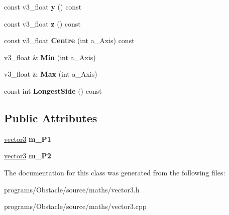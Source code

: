 \begin{DoxyCompactItemize}
\item 
const v3\+\_\+float {\bfseries y} () const \hypertarget{classns__phys_1_1aabb_ad7a7f387d75de8b71532cbdc98dd0f2a}{}\label{classns__phys_1_1aabb_ad7a7f387d75de8b71532cbdc98dd0f2a}

\item 
const v3\+\_\+float {\bfseries z} () const \hypertarget{classns__phys_1_1aabb_ac825eb24bcd7eff4978de57860f1cb3c}{}\label{classns__phys_1_1aabb_ac825eb24bcd7eff4978de57860f1cb3c}

\item 
const v3\+\_\+float {\bfseries Centre} (int a\+\_\+\+Axis) const \hypertarget{classns__phys_1_1aabb_a7859465b43bb122811b1ebd4120cd84a}{}\label{classns__phys_1_1aabb_a7859465b43bb122811b1ebd4120cd84a}

\item 
v3\+\_\+float \& {\bfseries Min} (int a\+\_\+\+Axis)\hypertarget{classns__phys_1_1aabb_a02f462d08225a10993a95b69208de7da}{}\label{classns__phys_1_1aabb_a02f462d08225a10993a95b69208de7da}

\item 
v3\+\_\+float \& {\bfseries Max} (int a\+\_\+\+Axis)\hypertarget{classns__phys_1_1aabb_a3854528122ceb89dfbddfd225cdbab2a}{}\label{classns__phys_1_1aabb_a3854528122ceb89dfbddfd225cdbab2a}

\item 
const int {\bfseries Longest\+Side} () const \hypertarget{classns__phys_1_1aabb_a1a63ff831dd8fc1804702c5078242725}{}\label{classns__phys_1_1aabb_a1a63ff831dd8fc1804702c5078242725}

\end{DoxyCompactItemize}
\subsection*{Public Attributes}
\begin{DoxyCompactItemize}
\item 
\hyperlink{classns__phys_1_1vector3}{vector3} {\bfseries m\+\_\+\+P1}\hypertarget{classns__phys_1_1aabb_acba89cbeab267a88adb20d08e392b581}{}\label{classns__phys_1_1aabb_acba89cbeab267a88adb20d08e392b581}

\item 
\hyperlink{classns__phys_1_1vector3}{vector3} {\bfseries m\+\_\+\+P2}\hypertarget{classns__phys_1_1aabb_a320c5adc05e41bcb68771743904030f4}{}\label{classns__phys_1_1aabb_a320c5adc05e41bcb68771743904030f4}

\end{DoxyCompactItemize}


The documentation for this class was generated from the following files\+:\begin{DoxyCompactItemize}
\item 
programs/\+Obstacle/source/maths/vector3.\+h\item 
programs/\+Obstacle/source/maths/vector3.\+cpp\end{DoxyCompactItemize}
